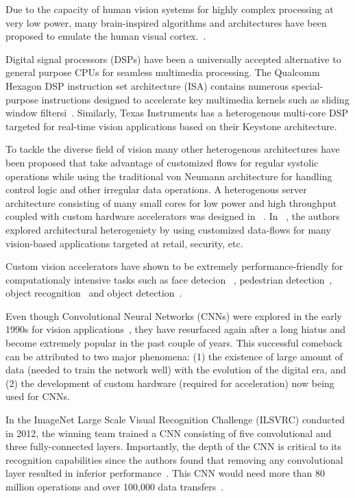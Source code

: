 
Due to the capacity of human vision systems for highly complex processing at very low power, many brain-inspired algorithms and architectures have been proposed to emulate the human visual cortex.~\cite{Nere2011,Chen2014,Kestur2012}. %

Digital signal processors (DSPs) have been a universally accepted alternative to general purpose CPUs for seamless multimedia processing. 
The Qualcomm Hexagon DSP instruction set architecture (ISA) contains numerous special-purpose instructions designed to accelerate key multimedia kernels such as 
sliding window filtersi~\cite{hexagon}. Similarly, Texas Instruments has a heterogenous multi-core DSP targeted for real-time vision applications 
based on their Keystone architecture.

To tackle the diverse field of vision many other heterogenous architectures have been proposed that take advantage of 
customized flows for regular systolic operations while
using the traditional von Neumann architecture for handling control logic and other irregular data operations. A heterogenous server architecture consisting of 
many small cores for low power and high throughput coupled with custom hardware accelerators was designed in ~\cite{Iyer2011}.
In ~\cite{HPCA2015}, the authors explored architectural heterogeniety by using customized data-flows for many vision-based applications targeted at retail, 
security, etc.

Custom vision accelerators have shown to be extremely performance-friendly for computationaly intensive tasks such as face detecion ~\cite{violafccm}, pedestrian detection~\cite{sips2014}, object recognition~\cite{Maashri2012a} and object detection~\cite{Bae2011}.

Even though Convolutional Neural Networks (CNNs) were explored in the early 1990s for vision applications~\cite{giles1997}, they have resurfaced again after a long hiatus and become extremely popular in the past couple of years. 
This successful comeback can be attributed to two major phenomena:
(1) the existence of large amount of data (needed to train the network well) with the evolution of the digital era, and (2) the development of 
custom hardware (required for acceleration) now being used for CNNs. 

In the ImageNet Large Scale Visual Recognition Challenge (ILSVRC)
conducted in 2012, the winning team trained a CNN consisting of five convolutional and three fully-connected layers. Importantly, the depth of the CNN is critical to 
its recognition capabilities since the authors found that removing any convolutional layer resulted in inferior performance~\cite{NIPS2012}. This CNN would need
more than 80 million operations and over 100,000 data transfers~\cite{XilinxCNN}.

